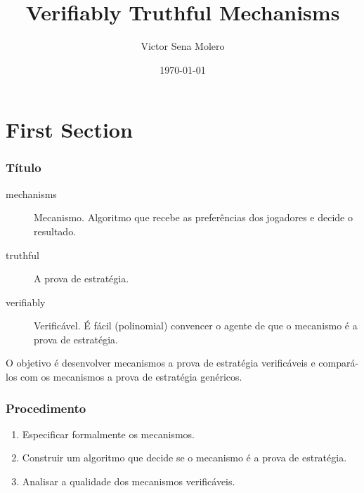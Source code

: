 \documentclass{beamer}
\title[Verifiably Truthful Mechanisms]{Verifiably Truthful Mechanisms} %
\author{Victor Sena Molero} %
\institute[IME-USP] %
{
Universidade de São Paulo \\ %
\medskip
\textit{victorsenam@gmail.com} %
}
\date{\today} %
\begin{document}
\begin{frame}
\titlepage %
\end{frame}



\section{First Section} %

\begin{frame}
\frametitle{Título}
\begin{description}
\item [mechanisms] Mecanismo. Algoritmo que recebe as preferências dos jogadores e decide o resultado.
\item [truthful] A prova de estratégia.
\item [verifiably] Verificável. É fácil (polinomial) convencer o agente de que o mecanismo é a prova de estratégia.
\end{description}

O objetivo é desenvolver mecanismos a prova de estratégia verificáveis e compará-los com os mecanismos a prova de estratégia genéricos.
\end{frame}

\begin{frame}
\frametitle{Procedimento}
\begin{enumerate}
\item Especificar formalmente os mecanismos.
\item Construir um algoritmo que decide se o mecanismo é a prova de estratégia.
\item Analisar a qualidade dos mecanismos verificáveis.
\end{enumerate}
\end{frame}
\end{document}
